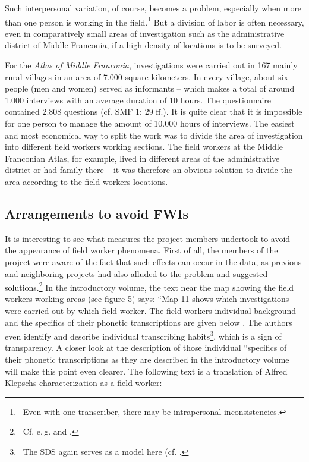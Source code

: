 \documentclass[output=paper]{LSP/langsci}
\begin{document}
Such interpersonal variation, of course, becomes a problem, especially when more than one person is working in the field.\footnote{\ Even with one transcriber, there may be intrapersonal inconsistencies.} But a division of labor is often necessary, even in comparatively small areas of investigation such as the administrative district of Middle Franconia, if a high density of locations is to be surveyed.

For the \textit{Atlas of Middle Franconia}, investigations were carried out in 167 mainly rural villages in an area of 7.000 square kilometers. In every village, about six people (men and women) served as informants – which makes a total of around 1.000 interviews with an average duration of 10 hours. The questionnaire contained 2.808 questions (cf. SMF 1: 29 ff.). It is quite clear that it is impossible for one person to manage the amount of 10.000 hours of interviews. The easiest and most economical way to split the work was to divide the area of investigation into different field workers{\textquotesingle} working sections. The field workers at the Middle Franconian Atlas, for example, lived in different areas of the administrative district or had family there – it was therefore an obvious solution to divide the area according to the field workers{\textquotesingle} locations.

\subsection{Arrangements to avoid FWIs}
It is interesting to see what measures the project members undertook to avoid the appearance of field worker phenomena. First of all, the members of the project were aware of the fact that such effects can occur in the data, as previous and neighboring projects had also alluded to the problem and suggested solutions.\footnote{\ Cf. e.\,g. \citet[59]{hotzenkocherle_einfuhrung_1962} and \citet[45]{konig_sprachatlas_1997}.} In the introductory volume, the text near the map showing the field workers{\textquotesingle} working areas (see figure 5) says: ``Map 11 shows which investigations were carried out by which field worker. The field workers{\textquotesingle} individual background and the specifics of their phonetic transcriptions are given below{\textquotedbl} \citep[47]{klepsch_sprachatlas_2013}. The authors even identify and describe individual transcribing habits\footnote{\ The SDS again serves as a model here (cf. \cite[61--73]{hotzenkocherle_einfuhrung_1962}.}, which is a sign of transparency. A closer look at the description of those individual ``specifics of their phonetic transcriptions{\textquotedbl} as they are described in the introductory volume will make this point even clearer. The following text is a translation of Alfred Klepsch{\textquotesingle}s characterization as a field worker:
\end{document}
